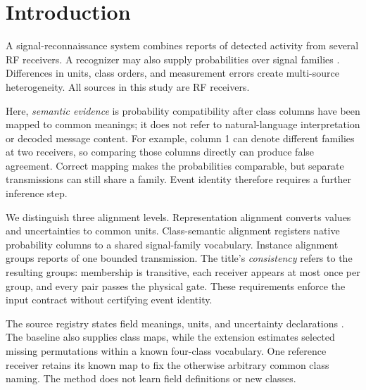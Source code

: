 \section{Introduction}
A signal-reconnaissance system combines reports of detected activity from several RF receivers. A recognizer may also supply probabilities over signal families \cite{syed2023,zhang2022amc,tian2026}. Differences in units, class orders, and measurement errors create multi-source heterogeneity. All sources in this study are RF receivers.

Here, \emph{semantic evidence} is probability compatibility after class columns have been mapped to common meanings; it does not refer to natural-language interpretation or decoded message content. For example, column 1 can denote different families at two receivers, so comparing those columns directly can produce false agreement. Correct mapping makes the probabilities comparable, but separate transmissions can still share a family. Event identity therefore requires a further inference step.

We distinguish three alignment levels. Representation alignment converts values and uncertainties to common units. Class-semantic alignment registers native probability columns to a shared signal-family vocabulary. Instance alignment groups reports of one bounded transmission. The title's \emph{consistency} refers to the resulting groups: membership is transitive, each receiver appears at most once per group, and every pair passes the physical gate. These requirements enforce the input contract without certifying event identity.


The source registry states field meanings, units, and uncertainty declarations \cite{ssn,sosa,emeterio2026}. The baseline also supplies class maps, while the extension estimates selected missing permutations within a known four-class vocabulary. One reference receiver retains its known map to fix the otherwise arbitrary common class naming. The method does not learn field definitions or new classes.

